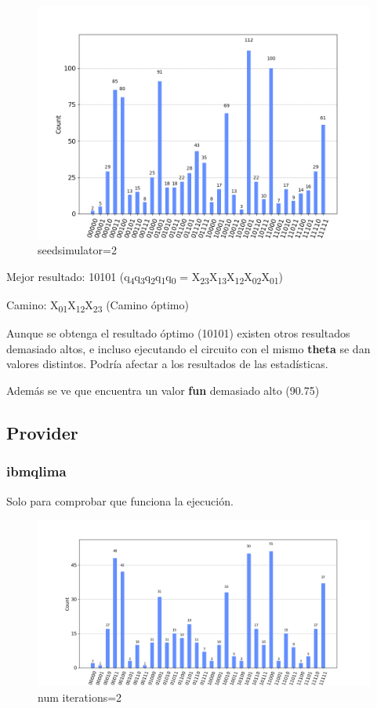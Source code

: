 \documentclass[letterpaper]{article}
\begin{document}
\begin{figure}[htbp]
\centering
\includegraphics[scale=0.5]{./img/primer_restr_aer_correcto-con-ruido.png}
\caption{seed\textunderscore simulator=2}
\end{figure}

Mejor resultado: 10101 (q\textsubscript{4}q\textsubscript{3}q\textsubscript{2}q\textsubscript{1}q\textsubscript{0} = X\textsubscript{23}X\textsubscript{13}X\textsubscript{12}X\textsubscript{02}X\textsubscript{01})

Camino: X\textsubscript{01}X\textsubscript{12}X\textsubscript{23} (Camino óptimo)

Aunque se obtenga el resultado óptimo (10101) existen otros resultados demasiado altos, e incluso ejecutando el circuito con el mismo \textbf{theta} se dan valores distintos. Podría afectar a los resultados de las estadísticas.

Además se ve que encuentra un valor \textbf{fun} demasiado alto (90.75)

\newpage

\subsection{Provider}
\label{sec:org585f1dc}
\subsubsection{ibmq\textunderscore lima}
\label{sec:org4c1e701}
Solo para comprobar que funciona la ejecución.

\begin{figure}[htbp]
\centering
\includegraphics[scale=0.4]{./img/primer_provider_iter-2.png}
\caption{num iterations=2}
\end{figure}
\end{document}
